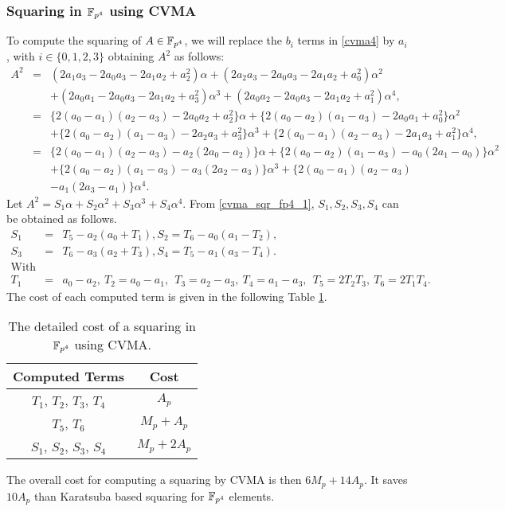 \subsubsection{Squaring in $\mathbb{F}_{p^4}$ using CVMA}
To compute the squaring of $A \in \mathbb{F}_{p^4}$, we will replace the $b_i$ terms in \eqref{cvma4} by $a_i$, with $i \in \{0, 1, 2, 3\}$ obtaining $A^2$ as follows:
\begin{eqnarray}
A^2&=&(2a_1a_3-2a_0a_3-2a_1a_2+a_2^2)\alpha\nonumber
+(2a_2a_3-2a_0a_3-2a_1a_2+a_0^2)\alpha^2\nonumber\\
&&+(2a_0a_1-2a_0a_3-2a_1a_2+a_3^2)\alpha^3\nonumber
+(2a_0a_2-2a_0a_3-2a_1a_2+a_1^2)\alpha^4\nonumber,\\
&=&\{2(a_0-a_1)(a_2-a_3)-2a_0a_2+a_2^2\}\alpha\nonumber
+\{2(a_0-a_2)(a_1-a_3)-2a_0a_1+a_0^2\}\alpha^2\nonumber\\
&&+\{2(a_0-a_2)(a_1-a_3)-2a_2a_3+a_3^2\}\alpha^3\nonumber
+\{2(a_0-a_1)(a_2-a_3)-2a_1a_3+a_1^2\}\alpha^4\nonumber,\\
&=&\{2(a_0-a_1)(a_2-a_3)-a_2(2a_0-a_2)\}\alpha\nonumber 
+\{2(a_0-a_2)(a_1-a_3)-a_0(2a_1-a_0)\}\alpha^2\nonumber\\
&&+\{2(a_0-a_2)(a_1-a_3)-a_3(2a_2-a_3)\}\alpha^3
+\{2(a_0-a_1)(a_2-a_3)\nonumber\\
&&-a_1(2a_3-a_1)\}\alpha^4\label{cvma_sqr_fp4_1}.
\end{eqnarray}
Let $A^2=S_1\alpha+S_2\alpha^2+S_3\alpha^3+S_4\alpha^4$. 
From \eqref{cvma_sqr_fp4_1}, $S_1,S_2,S_3,S_4$ can be obtained as follows.
\begin{eqnarray*}
S_1&=&T_5-a_2(a_0+T_1),S_2=T_6-a_0(a_1-T_2),\\
S_3&=&T_6-a_3(a_2+T_3),S_4=T_5-a_1(a_3-T_4).\\
\text{With}\\
T_1&=&a_0-a_2,\ T_2=a_0-a_1,\ \ T_3=a_2-a_3,\ T_4=a_1-a_3,\ \ T_5=2T_2T_3,\  T_6=2T_1T_4.
\end{eqnarray*}
The cost of each computed term is given in the following Table \ref{tab_cvma_sqr_cost_computedterms}.
\renewcommand{\baselinestretch}{1.2}
\begin{table}[!h]
	\centering
	\begin{tabular}{|c|c|}
		\hline
		 Computed  Terms & Cost       \\ 
		 \hline
		$T_1$, $T_2$, $T_3$, $T_4$   & $ A_p$    \\ \hline
		$T_5$, $T_6$            &  $ M_p+A_p$     \\ \hline
		$S_1$, $S_2$, $S_3$, $S_4$ & $ M_p+2A_p$\\ \hline
	\end{tabular}
	\caption{The detailed cost of a squaring in $\mathbb{F}_{p^4}$ using CVMA.}
	\label{tab_cvma_sqr_cost_computedterms}
\end{table}
\renewcommand{\baselinestretch}{1.0}
The overall cost for computing a squaring by CVMA is then $6M_p+14A_p$. It saves $10A_p$ than Karatsuba based squaring for $\mathbb{F}_{p^4}$ elements.
